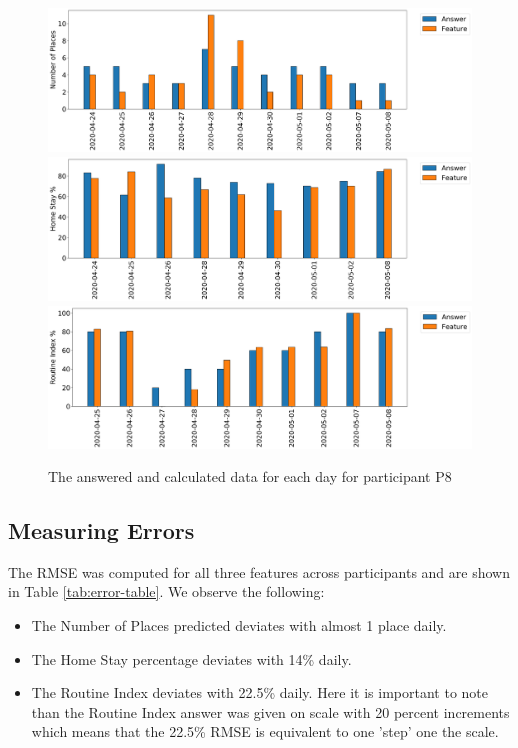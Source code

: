\begin{figure}[h]
    \centering
    \includegraphics[width=\textwidth]{images/study/places_ec110976-0192-436d-b451-4f5dd97e71d8.png}
    \includegraphics[width=\textwidth]{images/study/homestay_ec110976-0192-436d-b451-4f5dd97e71d8.png}
    \includegraphics[width=\textwidth]{images/study/routine_ec110976-0192-436d-b451-4f5dd97e71d8.png}
    \caption{The answered and calculated data for each day for participant P8}
    \label{fig:plot-p8-features}
\end{figure}


\subsection{Measuring Errors}
The RMSE was computed for all three features across participants and are shown in Table \ref{tab:error-table}. We observe the following:

\begin{itemize}
    \item The Number of Places predicted deviates with almost 1 place daily.

    \item The Home Stay percentage deviates with 14\% daily.

    \item The Routine Index deviates with 22.5\% daily. Here it is important to note than the Routine Index answer was given on scale with 20 percent increments which means that the 22.5\% RMSE is equivalent to one 'step' one the scale.
\end{itemize}


